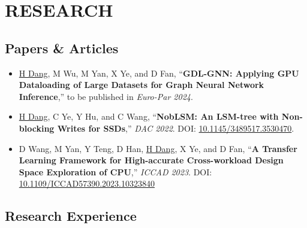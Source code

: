 \documentclass[a4paper,10pt]{ctexart} %
\begin{document}
\section{RESEARCH}

    \subsection{Papers \& Articles}

        \begin{itemize}
            \item \underline{H Dang}, M Wu, M Yan, X Ye, and D Fan, ``\textbf{GDL-GNN: Applying GPU Dataloading of Large Datasets for Graph Neural Network Inference},'' to be published in \textit{Euro-Par 2024}.
            \item \underline{H Dang}, C Ye, Y Hu, and C Wang, ``\textbf{NobLSM: An LSM-tree with Non-blocking Writes for SSDs},'' \textit{DAC 2022}. DOI: \href{https://doi.org/10.1145/3489517.3530470}{10.1145/3489517.3530470}.
            \item D Wang, M Yan, Y Teng, D Han, \underline{H Dang}, X Ye, and D Fan, ``\textbf{A Transfer Learning Framework for High-accurate Cross-workload Design Space Exploration of CPU},'' \textit{ICCAD 2023}. DOI: \href{https://doi.org/10.1109/ICCAD57390.2023.10323840}{10.1109/ICCAD57390.2023.10323840}
        \end{itemize}

    \subsection{Research Experience}
\end{document}
